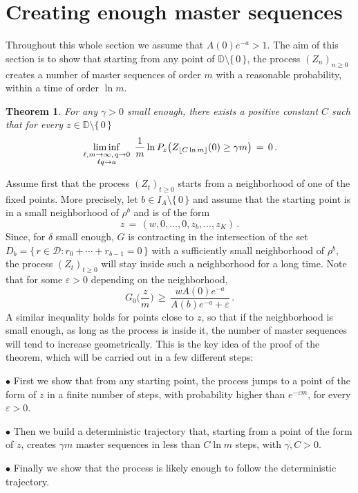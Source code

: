 \documentclass[a4paper,12pt]{article}
\newtheorem{theorem}{Theorem}[section]
\theoremstyle{definition}
\theoremstyle{remark}
\def \cD {\mathcal{D}}
\def \g {\gamma}
\def \d {\delta}
\def \e {\varepsilon}
\def \dD {\mathbb{D}}
\def \exa {e^{-a}}
\def\lmqq {{\genfrac{}{}{0pt}{1}{\ell,m\to\infty,\,q\to0}{\ell q\to a}}}
\begin{document}
\section{Creating enough master sequences}\label{ems}
Throughout this whole section we assume that $A(0)\exa>1$.
The aim of this section is to show that 
starting from any point of $\dD\setminus\lbrace\,0\,\rbrace$,
the process $(Z_n)_{n\geq 0}$ creates a number of master sequences
of order $m$
with a reasonable probability,
within a time of order $\ln m$.
\begin{theorem}\label{enoughms}
For any $\g>0$ small enough,
there exists a positive constant $C$ 
such that for every $z\in\dD\setminus\lbrace\, 0\,\rbrace$
$$\liminf_\lmqq\,
\frac{1}{m}\ln P_z\big(
Z_{\lfloor C\ln m\rfloor}(0)\geq \g m
\big)\,=\,0\,.$$
\end{theorem}
Assume first that the process $(Z_t)_{t\geq0}$
starts from a neighborhood of one of the fixed points.
More precisely, let $b\in I_A\setminus \lbrace\,0\,\rbrace$ and
assume that the starting point is in a small neighborhood
of $\rho^b$ and is of the form
$$z\,=\,(w,0,\dots,0,z_b,\dots,z_K)\,.$$
Since, for $\d$ small enough, $G$ is contracting in the intersection
of the set $D_b=\lbrace\,r\in\cD:r_0+\cdots+r_{b-1}=0\,\rbrace$
with a sufficiently small neighborhood of $\rho^b$,
the process $(Z_t)_{t\geq0}$ will stay inside such a neighborhood
for a long time.
Note that for some $\e>0$ depending on the neighborhood,
$$G_0\Big(
\frac{z}{m}
\Big)\,\geq\,\frac{w A(0)\exa}{A(b)\exa+\e}\,.$$
A similar inequality holds for points close to $z$,
so that if the neighborhood is small enough,
as long as the process is inside it,
the number of master sequences will tend to increase geometrically.
This is the key idea of the proof of the theorem,
which will be carried out in a few different steps:

$\bullet$ First we show that from any starting point,
the process jumps to a point of the form of $z$
in a finite number of steps,
with probability higher than $e^{-\e m}$, for every $\e>0$.

$\bullet$ Then we build a deterministic trajectory that,
starting from a point of the form of $z$, creates $\g m$ master sequences 
in less than $C\ln m$ steps, with $\g, C>0$.

$\bullet$ Finally we show that 
the process is likely enough to follow the 
deterministic trajectory.
\end{document}
